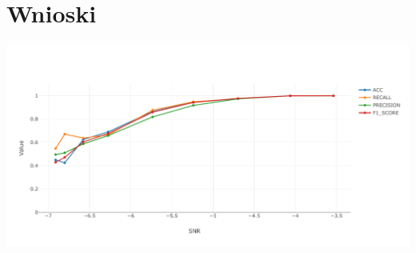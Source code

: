 \documentclass[12pt, a4paper, oneside]{article}
\begin{document}
	\section{Wnioski}
	
	
	
	\begin{center}
		\includegraphics[width=16cm]{images/nn_small_5.pdf}
	\end{center}
	
	
	
\end{document}
